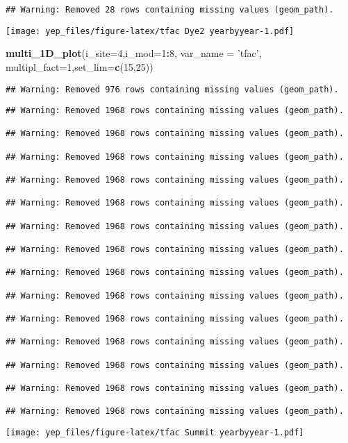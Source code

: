 \documentclass[]{article}
\newenvironment{Shaded}{\begin{snugshade}}{\end{snugshade}}
\newcommand{\DataTypeTok}[1]{\textcolor[rgb]{0.13,0.29,0.53}{#1}}
\newcommand{\DecValTok}[1]{\textcolor[rgb]{0.00,0.00,0.81}{#1}}
\newcommand{\KeywordTok}[1]{\textcolor[rgb]{0.13,0.29,0.53}{\textbf{#1}}}
\newcommand{\NormalTok}[1]{#1}
\newcommand{\OperatorTok}[1]{\textcolor[rgb]{0.81,0.36,0.00}{\textbf{#1}}}
\newcommand{\StringTok}[1]{\textcolor[rgb]{0.31,0.60,0.02}{#1}}
\begin{document}
\begin{verbatim}
## Warning: Removed 28 rows containing missing values (geom_path).
\end{verbatim}

\texttt{[image: yep\_files/figure-latex/tfac Dye2 yearbyyear-1.pdf]}

\begin{Shaded}
\begin{Highlighting}[]
\KeywordTok{multi_1D_plot}\NormalTok{(}\DataTypeTok{i_site=}\DecValTok{4}\NormalTok{,}\DataTypeTok{i_mod=}\DecValTok{1}\OperatorTok{:}\DecValTok{8}\NormalTok{, }\DataTypeTok{var_name =} \StringTok{'tfac'}\NormalTok{,  }\DataTypeTok{multipl_fact=}\DecValTok{1}\NormalTok{,}\DataTypeTok{set_lim=}\KeywordTok{c}\NormalTok{(}\DecValTok{15}\NormalTok{,}\DecValTok{25}\NormalTok{))  }
\end{Highlighting}
\end{Shaded}

\begin{verbatim}
## Warning: Removed 976 rows containing missing values (geom_path).
\end{verbatim}

\begin{verbatim}
## Warning: Removed 1968 rows containing missing values (geom_path).

## Warning: Removed 1968 rows containing missing values (geom_path).

## Warning: Removed 1968 rows containing missing values (geom_path).

## Warning: Removed 1968 rows containing missing values (geom_path).

## Warning: Removed 1968 rows containing missing values (geom_path).

## Warning: Removed 1968 rows containing missing values (geom_path).

## Warning: Removed 1968 rows containing missing values (geom_path).

## Warning: Removed 1968 rows containing missing values (geom_path).

## Warning: Removed 1968 rows containing missing values (geom_path).

## Warning: Removed 1968 rows containing missing values (geom_path).

## Warning: Removed 1968 rows containing missing values (geom_path).

## Warning: Removed 1968 rows containing missing values (geom_path).

## Warning: Removed 1968 rows containing missing values (geom_path).

## Warning: Removed 1968 rows containing missing values (geom_path).
\end{verbatim}

\texttt{[image: yep\_files/figure-latex/tfac Summit yearbyyear-1.pdf]}
\end{document}
